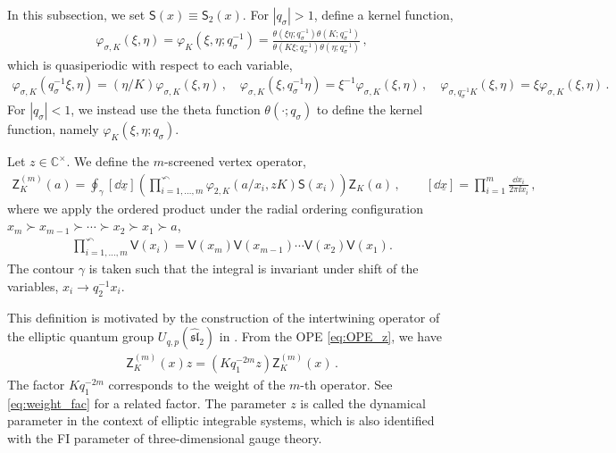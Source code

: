 In this subsection, we set $\mathsf{S}(x) \equiv \mathsf{S}_2(x)$.
For $|q_\sigma|>1$, define a kernel function,
\begin{align}
    \varphi_{\sigma,K}(\xi,\eta) = \varphi_{K}(\xi,\eta;q_\sigma^{-1}) = \frac{\theta(\xi \eta;q_\sigma^{-1}) \theta(K;q_\sigma^{-1})}{\theta(K \xi;q_\sigma^{-1}) \theta(\eta;q_\sigma^{-1})}
    \, ,
\end{align}
which is quasiperiodic with respect to each variable,
\begin{align}
    \varphi_{\sigma,K}(q_\sigma^{-1} \xi, \eta) = (\eta/K) \varphi_{\sigma,K}(\xi, \eta)
    \, , \quad 
    \varphi_{\sigma,K}(\xi, q_\sigma^{-1} \eta) = \xi^{-1} \varphi_{\sigma,K}(\xi, \eta)
    \, , \quad 
    \varphi_{\sigma,q_\sigma^{-1} K}(\xi, \eta) = \xi \varphi_{\sigma,K}(\xi, \eta)
    \, .
\end{align}
For $|q_\sigma| < 1$, we instead use the theta function $\theta(\cdot;q_\sigma)$ to define the kernel function, namely $\varphi_K(\xi,\eta;q_\sigma)$.

\begin{definition}\label{def:Z_screened}
    Let $z \in \mathbb{C}^\times$.
    We define the $m$-screened vertex operator,
    \begin{align}
        \mathsf{Z}_K^{(m)}(a) = \oint_\gamma [\dd{\underline{x}}] \left( \prod_{i=1,\ldots,m}^{\curvearrowleft} \varphi_{2,K}(a/x_i,zK) \mathsf{S}(x_i) \right) \mathsf{Z}_K(a)
        \, , \qquad
        [\dd{\underline{x}}] = \prod_{i=1}^m \frac{\dd{x}_i}{2 \pi \ii x_i} \, ,
    \end{align}
    where we apply the ordered product under the radial ordering configuration $x_m \succ x_{m-1} \succ \cdots \succ x_2 \succ x_1 \succ a$,
    \begin{align}
        \prod_{i=1,\ldots,m}^{\curvearrowleft} \mathsf{V}(x_i) = \mathsf{V}(x_m) \mathsf{V}(x_{m-1}) \cdots \mathsf{V}(x_2) \mathsf{V}(x_1) .
    \end{align}
    The contour $\gamma$ is taken such that the integral is invariant under shift of the variables, $x_i \to q_2^{-1} x_i$.
\end{definition}
This definition is motivated by the construction of the intertwining operator of the elliptic quantum group $U_{q,p}(\widehat{\mathfrak{sl}}_2)$ in \cite[\S5.3]{Jimbo:1998bi}.
From the OPE \eqref{eq:OPE_z}, we have
    \begin{align}
        \mathsf{Z}_K^{(m)}(x) z = (K q_1^{-2m} z) \mathsf{Z}_K^{(m)}(x)
        \, .
        \label{eq:Zz_weight}
    \end{align}
The factor $K q_1^{-2m}$ corresponds to the weight of the $m$-th operator.
See \eqref{eq:weight_fac} for a related factor.
The parameter $z$ is called the dynamical parameter in the context of elliptic integrable systems, which is also identified with the FI parameter of three-dimensional gauge theory.

